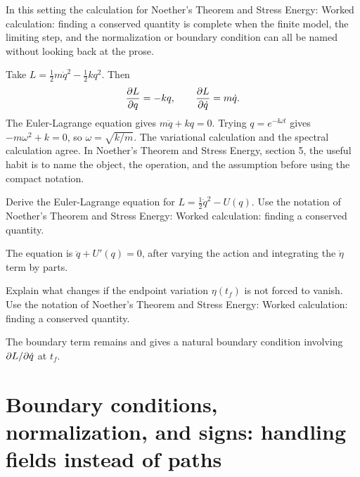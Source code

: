 In this setting the calculation for Noether's Theorem and Stress Energy: Worked calculation: finding a conserved quantity is complete when the finite model, the limiting step, and the normalization or boundary condition can all be named without looking back at the prose.




\begin{example}
Take \(L=\frac12m\dot q^2-\frac12kq^2\).  Then
\[
  \frac{\partial L}{\partial q}=-kq,\qquad \frac{\partial L}{\partial\dot q}=m\dot q.
\]
The Euler-Lagrange equation gives \(m\ddot q+kq=0\).  Trying \(q=e^{-\ii\omega t}\) gives \(-m\omega^2+k=0\), so \(\omega=\sqrt{k/m}\).  The variational calculation and the spectral calculation agree.  In Noether's Theorem and Stress Energy, section 5, the useful habit is to name the object, the operation, and the assumption before using the compact notation.
\end{example}



\begin{exercise}
Derive the Euler-Lagrange equation for \(L=\frac12\dot q^2-U(q)\).  Use the notation of Noether's Theorem and Stress Energy: Worked calculation: finding a conserved quantity.
\begin{answer}
The equation is \(\ddot q+U'(q)=0\), after varying the action and integrating the \(\dot\eta\) term by parts.
\end{answer}
\end{exercise}

\begin{exercise}
Explain what changes if the endpoint variation \(\eta(t_f)\) is not forced to vanish.  Use the notation of Noether's Theorem and Stress Energy: Worked calculation: finding a conserved quantity.
\begin{answer}
The boundary term remains and gives a natural boundary condition involving \(\partial L/\partial\dot q\) at \(t_f\).
\end{answer}
\end{exercise}



\section{Boundary conditions, normalization, and signs: handling fields instead of paths}













